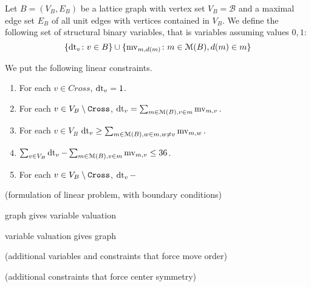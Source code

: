 \begin{definition}  
  Let $B = (V_B, E_B)$ be a lattice graph with vertex set $V_B = \mathcal{B}$ and a maximal edge set $E_B$
    of all unit edges with vertices contained in $V_B$.
  We define the following set of structural binary variables, that is variables assuming values $0, 1$:
  \[
  \{ \operatorname{dt}_v \colon v \in B \} \cup \{ \operatorname{mv}_{m, d(m)} \colon m \in \mathcal{M}(B), d(m) \in m \}
  \]
  
  We put the following linear constraints.
  \begin{enumerate}
  \item For each $v \in Cross$, $\operatorname{dt}_v = 1$.
  \item For each $v \in V_B \setminus \texttt{Cross}$, $\operatorname{dt}_v = \sum_{m \in \mathcal{M}(B), v \in m} \operatorname{mv}_{m, v}$.
  \item For each $v \in V_B$
  $
  	\operatorname{dt}_v \geq \sum_{m \in \mathcal{M}(B), w \in m, w \neq v} \operatorname{mv}_{m, w}.
  $
  \item $\sum_{v \in V_B} \operatorname{dt}_v - \sum_{m \in \mathcal{M}(B), v \in m} \operatorname{mv}_{m, v} \leq 36$.
  \item For each $v \in V_B \setminus \texttt{Cross}$, $\operatorname{dt}_v - $
  \end{enumerate}
\end{definition}

(formulation of linear problem, with boundary conditions)

\begin{lemma}
  graph gives variable valuation
\end{lemma}

\begin{lemma}
  variable valuation gives graph
\end{lemma}

(additional variables and constraints that force move order)

(additional constraints that force center symmetry)
